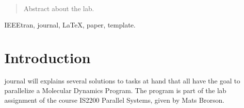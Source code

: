 \documentclass[journal]{IEEEtran}
\begin{document}




\maketitle

\begin{abstract}

Abstract about the lab.

\end{abstract}

\begin{IEEEkeywords}
IEEEtran, journal, \LaTeX, paper, template.
\end{IEEEkeywords}






%
\IEEEpeerreviewmaketitle



\section{Introduction}
% 
% 
% 
% 
 journal will explains several solutions to tasks at hand that all have the goal to parallelize a Molecular Dynamics Program. The program is part of the lab assignment of the course IS2200 Parallel Systems, given by Mats Brorson.
\end{document}
